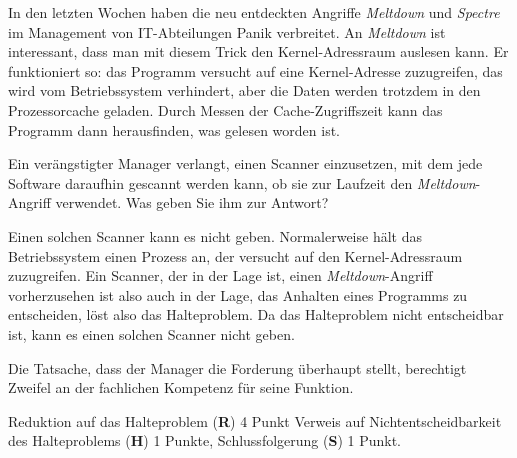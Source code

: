 In den letzten Wochen haben die neu entdeckten Angriffe {\em Meltdown} und
{\em Spectre} im Management von IT-Abteilungen Panik verbreitet.
An {\em Meltdown} ist interessant, dass man mit diesem Trick den
Kernel-Adressraum auslesen kann.
Er funktioniert so: das Programm versucht auf eine Kernel-Adresse
zuzugreifen, das wird vom Betriebssystem verhindert, aber die Daten werden
trotzdem in den Prozessorcache geladen.
Durch Messen der Cache-Zugriffszeit kann das Programm dann
herausfinden, was gelesen worden ist.

Ein verängstigter Manager verlangt, einen Scanner einzusetzen, mit dem 
jede Software daraufhin gescannt werden kann, ob sie zur Laufzeit
den {\em Meltdown}-Angriff verwendet.
Was geben Sie ihm zur Antwort?

\begin{loesung}
Einen solchen Scanner kann es nicht geben.
Normalerweise hält das Betriebssystem einen Prozess an, der versucht
auf den Kernel-Adressraum zuzugreifen.
Ein Scanner, der in der Lage ist, einen {\em Meltdown}-Angriff vorherzusehen
ist also auch in der Lage, das Anhalten eines Programms zu entscheiden,
löst also das Halteproblem.
Da das Halteproblem nicht entscheidbar ist, kann es einen solchen
Scanner nicht geben.
\end{loesung}

\begin{diskussion}
Die Tatsache, dass der Manager die Forderung überhaupt stellt,
berechtigt Zweifel an der fachlichen Kompetenz für seine Funktion.
\end{diskussion}

\begin{bewertung}
Reduktion auf das Halteproblem ({\bf R}) 4 Punkt
Verweis auf Nichtentscheidbarkeit des Halteproblems ({\bf H}) 1 Punkte,
Schlussfolgerung ({\bf S}) 1 Punkt.
\end{bewertung}

